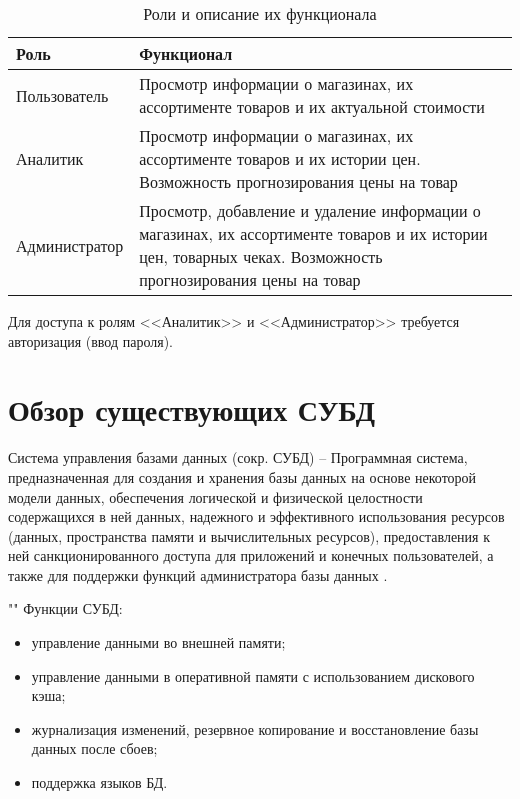 \documentclass[a4paper,14pt]{extreport}
\begin{document}
\begin{table}[H]
	\caption{Роли и описание их функционала}
	\begin{center}
		\begin{tabular}{| l | p{12 cm} |} 
			\hline
			
			\textbf{Роль} & \textbf{Функционал} \\  
			
			\hline
			
			Пользователь & Просмотр информации о магазинах, их ассортименте товаров и их актуальной стоимости \\
			
			\hline
			
			Аналитик & Просмотр информации о магазинах, их ассортименте товаров и их истории цен. Возможность прогнозирования цены на товар \\
			
			\hline
			
			Администратор & Просмотр, добавление и удаление информации о магазинах, их ассортименте товаров и их истории цен, товарных чеках. Возможность прогнозирования цены на товар \\
			
			\hline
		\end{tabular}
	\end{center}
\end{table}

Для доступа к ролям <<Аналитик>> и <<Администратор>> требуется авторизация (ввод пароля).

\section{Обзор существующих СУБД}

Система управления базами данных (сокр. СУБД) -- Программная система, предназначенная для создания и хранения базы данных на основе некоторой модели данных, обеспечения логической и физической целостности содержащихся в ней данных, надежного и эффективного использования ресурсов (данных, пространства памяти и вычислительных ресурсов), предоставления к ней санкционированного доступа для приложений и конечных пользователей, а также для поддержки 
функций администратора базы данных \cite{kogal}.

""\newline
Функции СУБД:

\begin{itemize}
	\setlength\itemsep{0.05em}
	\item управление данными во внешней памяти;
	\item управление данными в оперативной памяти с использованием дискового кэша;
	\item журнализация изменений, резервное копирование и восстановление базы данных после сбоев;
	\item поддержка языков БД.
\end{itemize}
\end{document}
